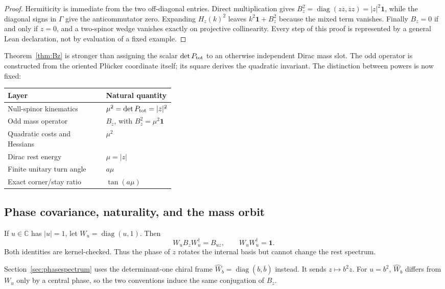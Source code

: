 \documentclass[11pt]{article}
\newcommand{\diag}{\operatorname{diag}}
\newcommand{\C}{\mathbb{C}}
\newcommand{\id}{\mathbf{1}}
\begin{document}
\begin{proof}
Hermiticity is immediate from the two off-diagonal entries.  Direct
multiplication gives
$B_z^2=\diag(z\overline z,\overline z z)=|z|^2\id$, while the diagonal signs
in $\Gamma$ give the anticommutator zero.  Expanding $H_z(k)^2$ leaves
$k^2\id+B_z^2$ because the mixed term vanishes.  Finally $B_z=0$ if and only
if $z=0$, and a two-spinor wedge vanishes exactly on projective collinearity.
Every step of this proof is represented by a general Lean declaration, not by
evaluation of a fixed example.
\end{proof}

Theorem~\ref{thm:Bz} is stronger than assigning the scalar $\det P_{\rm tot}$ to an
otherwise independent Dirac mass slot.  The odd operator is constructed from
the oriented Pl\"ucker coordinate itself; its square derives the quadratic
invariant.  The distinction between powers is now fixed:

\begin{center}
\begin{tabularx}{0.92\linewidth}{@{}X>{\raggedleft\arraybackslash}p{0.38\linewidth}@{}}
\toprule
Layer & Natural quantity\\
\midrule
Null-spinor kinematics & $\mu^2=\det P_{\rm tot}=|z|^2$\\
Odd mass operator & $B_z$, with $B_z^2=\mu^2\id$\\
Quadratic costs and Hessians & $\mu^2$\\
Dirac rest energy & $\mu=|z|$\\
Finite unitary turn angle & $a\mu$\\
Exact corner/stay ratio & $\tan(a\mu)$\\
\bottomrule
\end{tabularx}
\end{center}

\subsection{Phase covariance, naturality, and the mass orbit}

If $u\in\C$ has $|u|=1$, let $W_u=\diag(u,1)$.  Then
\begin{equation}\label{eq:phasecov}
 W_uB_zW_u^\dagger=B_{uz},
 \qquad
 W_uW_u^\dagger=\id.
\end{equation}
Both identities are kernel-checked.  Thus the phase of $z$ rotates the internal
basis but cannot change the rest spectrum.

Section~\ref{sec:phasespectrum} uses the determinant-one chiral frame
$\widehat W_b=\diag(b,\overline b)$ instead.  It sends $z\mapsto b^2z$.
For $u=b^2$, $\widehat W_b$ differs from $W_u$ only by a central phase, so the
two conventions induce the same conjugation of $B_z$.
\end{document}

